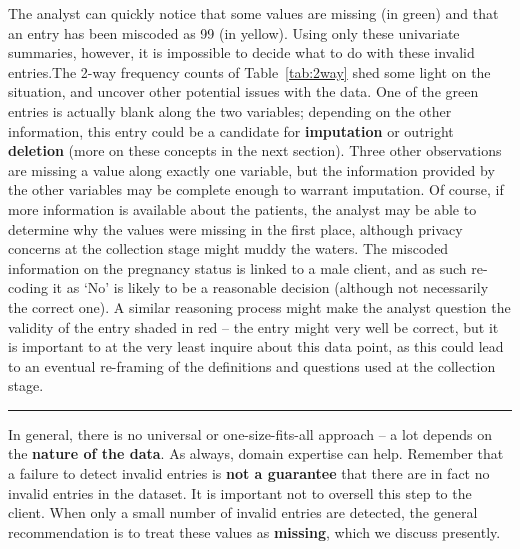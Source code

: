 The analyst can quickly notice that some values are missing (in green) and that an entry has been miscoded as 99 (in yellow). Using only these univariate summaries, however, it is impossible to decide what to do with these invalid entries.\newpage\noindent The 2-way frequency counts of Table~\ref{tab:2way} shed some light on the situation, and uncover other potential issues with the data. One of the green entries is actually blank along the two variables; depending on the other information, this entry could be a candidate for \textbf{imputation} or outright \textbf{deletion} (more on these concepts in the next section). Three other observations are missing a value along exactly one variable, but the information provided by the other variables may be complete enough to warrant imputation. Of course, if more information is available about the patients, the analyst may be able to determine why the values were missing in the first place, although privacy concerns at the collection stage might muddy the waters. The miscoded information on the pregnancy status is linked to a male client, and as such re-coding it as `No' is likely to be a reasonable decision (although not necessarily the correct one). A similar reasoning process might make the analyst question the validity of the entry shaded in red -- the entry might very well be correct, but it is important to at the very least inquire about this data point, as this could lead to an eventual re-framing of the definitions and questions used at the collection stage.   
\begin{center}
    \rule{0.5\textwidth}{.4pt}
\end{center}
In general, there is no universal or one-size-fits-all approach -- a lot depends on the \textbf{nature of the data}. As always, domain expertise can help. Remember that a failure to detect invalid entries is \textbf{not a guarantee} that there are in fact no invalid entries in the dataset. It is important not to oversell this step to the client. When only a small number of invalid entries are detected, the general recommendation is to treat these values as  \textbf{missing}, which we discuss presently.
